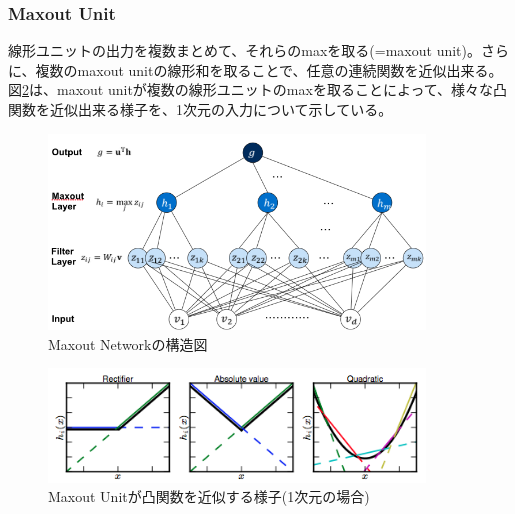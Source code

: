 \subsubsection{Maxout Unit}
線形ユニットの出力を複数まとめて、それらのmaxを取る(=maxout unit)。さらに、複数のmaxout unitの線形和を取ることで、任意の連続関数を近似出来る。\\
図\ref{c3_maxout_app}は、maxout unitが複数の線形ユニットのmaxを取ることによって、様々な凸関数を近似出来る様子を、1次元の入力について示している。
\begin{figure}[tbp]
 \begin{center}
  \includegraphics[width=100mm]{img/c3/maxout_arch}
 \end{center}
 \caption{Maxout Networkの構造図}
 \label{c3_maxout_arch}
\end{figure}
\begin{figure}[tbp]
 \begin{center}
  \includegraphics[width=100mm]{img/c3/maxout_app}
 \end{center}
 \caption{Maxout Unitが凸関数を近似する様子(1次元の場合)}
 \label{c3_maxout_app}
\end{figure}
